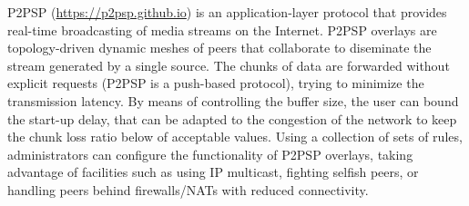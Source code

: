 

P2PSP (\url{https://p2psp.github.io}) is an application-layer protocol
that provides real-time broadcasting of media streams on the
Internet. P2PSP overlays are topology-driven dynamic meshes of peers
that collaborate to diseminate the stream generated by a single
source. The chunks of data are forwarded without explicit requests
(P2PSP is a push-based protocol), trying to minimize the transmission
latency. By means of controlling the buffer size, the user can bound
the start-up delay, that can be adapted to the congestion of the
network to keep the chunk loss ratio below of acceptable values. Using
a collection of sets of rules, administrators can configure the
functionality of P2PSP overlays, taking advantage of facilities such
as using IP multicast, fighting selfish peers, or handling peers
behind firewalls/NATs with reduced connectivity.
